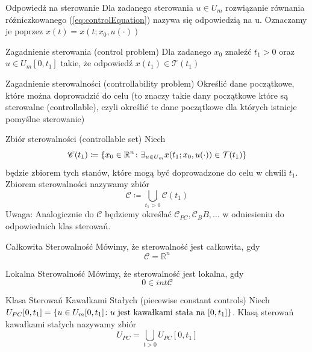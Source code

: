 \begin{definition}{Odpowiedź na sterowanie}{}{}
    Dla zadanego sterowania $u \in U_m$ rozwiązanie równania różniczkowanego (\ref{eq:controlEquation}) nazywa się odpowiedzią na u. Oznaczamy je poprzez $x(t) = x(t; x_0, u(\cdot))$
\end{definition}

\begin{definition}{Zagadnienie sterowania (control problem)}{}{}
    Dla zadanego $x_0$ znaleźć $t_1 > 0$ oraz $u \in U_m [0, t_1]$ takie, że odpowiedź $x(t_1) \in \mathcal{T}(t_1)$
\end{definition}

\begin{definition}{Zagadnienie sterowalności (controllability problem)}{}{}
    Określić dane początkowe, które można doprowadzić do celu (to znaczy takie dany początkowe które są sterowalne (controllable), czyli określić te dane początkowe dla których istnieje pomyślne sterowanie)
\end{definition}

\begin{definition}{Zbiór sterowalności (controllable set)}{}{}
    Niech $$\mathscr{C}(t_1) \coloneqq \{x_0 \in \mathbb{R}^n \colon \exists_{u \in U_m} x(t_1; x_0, u(\cdot)) \in \mathcal{T}(t_1)\}$$ będzie zbiorem tych stanów, które mogą być doprowadzone do celu w chwili $t_1$. \\
    Zbiorem sterowalności nazywamy zbiór 
    $$\mathscr{C} \coloneqq \bigcup_{t_1 > 0} \mathscr{C}(t_1)$$
    Uwaga: Analogicznie do $\mathcal{C}$ będziemy określać $\mathscr{C}_{PC}, \mathscr{C}_BB, \dots$ w odniesieniu do odpowiednich klas sterowań.
\end{definition}

\begin{definition}{Całkowita Sterowalność}{}{}
    Mówimy, że sterowalność jest całkowita, gdy $$\mathscr{C} = \mathbb{R}^n$$
\end{definition}

\begin{definition}{Lokalna Sterowalność}{}{}
    Mówimy, że sterowalność jest lokalna, gdy $$0 \in int \mathscr{C}$$
\end{definition}

\begin{definition}{Klasa Sterowań Kawałkami Stałych (piecewise constant controls)}{}{}
    Niech $U_{PC}[0, t_1] = \{u \in U_m[0, t_1] \colon u \text{ jest kawałkami stała na } [0, t_1]\}$. Klasą sterowań kawałkami stałych nazywamy zbiór 
    $$U_{PC} = \bigcup_{t > 0} U_{PC}[0, t_1]$$
\end{definition}

